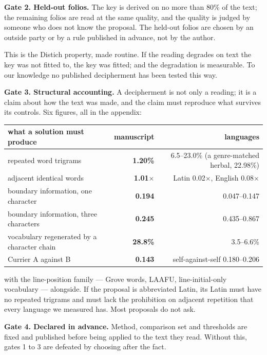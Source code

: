 \documentclass[11pt,a4paper]{article}
\begin{document}
\textbf{Gate 2. Held-out folios.} The key is derived on no more than 80\% of the text; the remaining folios are read at the same quality, and the quality is judged by someone who does not know the proposal. The held-out folios are chosen by an outside party or by a rule published in advance, not by the author.


This is the Distich property, made routine. If the reading degrades on text the key was not fitted to, the key was fitted; and the degradation is measurable. To our knowledge no published decipherment has been tested this way.


\textbf{Gate 3. Structural accounting.} A decipherment is not only a reading; it is a claim about how the text was made, and the claim must reproduce what survives its controls. Six figures, all in the appendix:


\begin{table}[htbp]\centering\small
\begin{tabular}{@{}lrr@{}}
\toprule
what a solution must produce & manuscript & languages \\
\midrule
repeated word trigrams & \textbf{1.20\%} & 6.5--23.0\% (a genre-matched herbal, 22.98\%) \\
adjacent identical words & \textbf{1.01$\times$} & Latin 0.02$\times$, English 0.08$\times$ \\
boundary information, one character & \textbf{0.194} & 0.047--0.147 \\
boundary information, three characters & \textbf{0.245} & 0.435--0.867 \\
vocabulary regenerated by a character chain & \textbf{28.8\%} & 3.5--6.6\% \\
Currier A against B & \textbf{0.143} & self-against-self 0.180--0.206 \\
\bottomrule
\end{tabular}
\end{table}


with the line-position family --- Grove words, LAAFU, line-initial-only vocabulary --- alongside. If the proposal is abbreviated Latin, its Latin must have no repeated trigrams and must lack the prohibition on adjacent repetition that every language we measured has. Most proposals do not ask.


\textbf{Gate 4. Declared in advance.} Method, comparison set and thresholds are fixed and published before being applied to the text they read. Without this, gates 1 to 3 are defeated by choosing after the fact.
\end{document}
